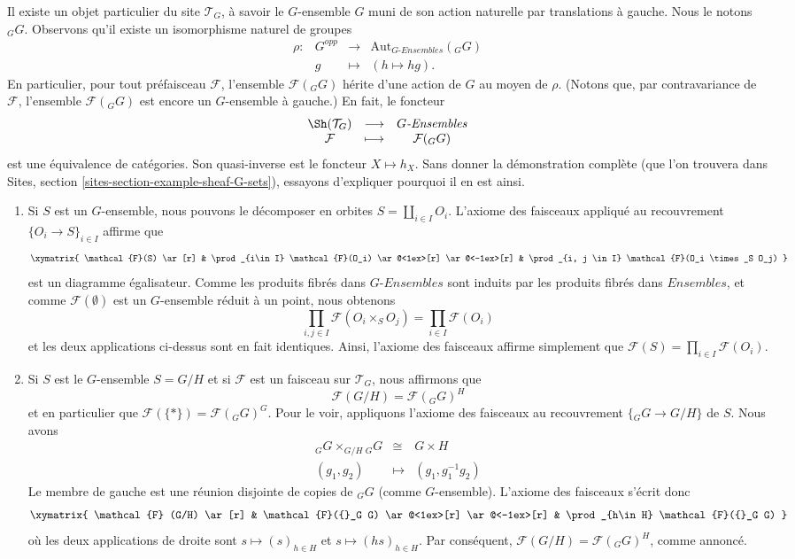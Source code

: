 \medskip\noindent
Il existe un objet particulier du site $\mathcal{T}_G$, \`a savoir le $G$-ensemble $G$
muni de son action naturelle par translations \`a gauche. Nous le notons ${}_G G$.
Observons qu'il existe un isomorphisme naturel de groupes
$$
\begin{matrix}
\rho : & G^{opp} & \longrightarrow & \text{Aut}_{G\textit{-Ensembles}}({}_G G) \\
& g & \longmapsto & (h \mapsto hg).
\end{matrix}
$$
En particulier, pour tout pr\'efaisceau $\mathcal{F}$, l'ensemble $\mathcal{F}({}_G G)$
h\'erite d'une action de $G$ au moyen de $\rho$. (Notons que, par contravariance de
$\mathcal{F}$, l'ensemble $\mathcal{F}({}_G G)$ est encore un $G$-ensemble \`a gauche.) En fait,
le foncteur
$$
\begin{matrix}
\Sh(\mathcal{T}_G) & \longrightarrow & G\textit{-Ensembles} \\
\mathcal{F} & \longmapsto & \mathcal{F}({}_G G)
\end{matrix}
$$
est une \'equivalence de cat\'egories. Son quasi-inverse est le foncteur $X \mapsto
h_X$. Sans donner la d\'emonstration compl\`ete (que l'on trouvera dans
Sites, section \ref{sites-section-example-sheaf-G-sets}),
essayons d'expliquer pourquoi il en est ainsi.
\begin{enumerate}
\item
Si $S$ est un $G$-ensemble, nous pouvons le d\'ecomposer en orbites $S = \coprod_{i\in I}
O_i$. L'axiome des faisceaux appliqu\'e au recouvrement $\{O_i \to S\}_{i\in I}$ affirme que
$$
\xymatrix{
\mathcal{F}(S) \ar[r] &
\prod_{i\in I} \mathcal{F}(O_i) \ar@<1ex>[r] \ar@<-1ex>[r] &
\prod_{i, j \in I} \mathcal{F}(O_i \times_S O_j)
}
$$
est un diagramme \'egalisateur. Comme les produits fibr\'es dans $G\textit{-Ensembles}$
sont induits par les produits fibr\'es dans $\textit{Ensembles}$, et comme
$\mathcal{F}(\emptyset)$ est un $G$-ensemble r\'eduit \`a un point, nous obtenons
$$
\prod_{i, j \in I} \mathcal{F}(O_i \times_S O_j) = \prod_{i \in I}
\mathcal{F}(O_i)
$$
et les deux applications ci-dessus sont en fait identiques. Ainsi, l'axiome des faisceaux affirme simplement
que $\mathcal{F}(S) = \prod_{i\in I} \mathcal{F}(O_i)$.
\item
Si $S$ est le $G$-ensemble $S= G/H$ et si $\mathcal{F}$ est un faisceau sur $\mathcal{T}_G$,
nous affirmons que
$$
\mathcal{F}(G/H) = \mathcal{F}({}_G G)^H
$$
et en particulier que $\mathcal{F}(\{*\}) = \mathcal{F}({}_G G)^G$. Pour le voir,
appliquons l'axiome des faisceaux au recouvrement $\{ {}_G G \to G/H \}$ de $S$. Nous
avons
\begin{eqnarray*}
{}_G G \times_{G/H} {}_G G & \cong & G \times H \\
(g_1, g_2) & \longmapsto & (g_1, g_1^{-1} g_2)
\end{eqnarray*}
Le membre de gauche est une r\'eunion disjointe de copies de ${}_G G$ (comme $G$-ensemble). L'axiome des faisceaux
s'\'ecrit donc
$$
\xymatrix{
\mathcal{F} (G/H) \ar[r] &
\mathcal{F}({}_G G) \ar@<1ex>[r] \ar@<-1ex>[r] &
\prod_{h\in H} \mathcal{F}({}_G G)
}
$$
o\`u les deux applications de droite sont $s \mapsto (s)_{h \in H}$ et $s \mapsto
(hs)_{h \in H}$. Par cons\'equent, $\mathcal{F}(G/H) = \mathcal{F}({}_G G)^H$, comme
annonc\'e.
\end{enumerate}
